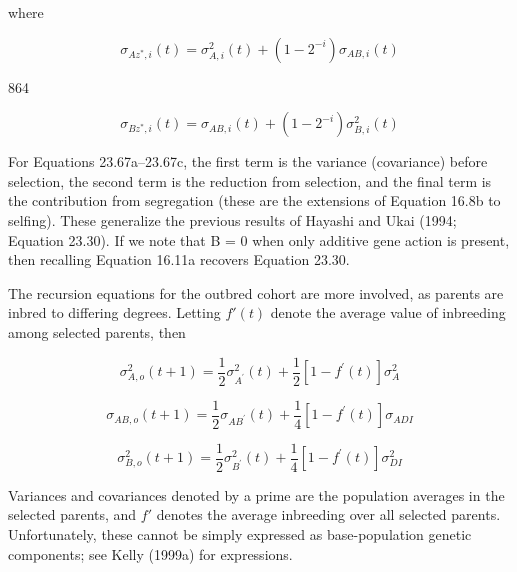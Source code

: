 \documentclass{article}
\begin{document}
where

\begin{equation}
\sigma_{A z^{*},i}(t)=\sigma_{A,i}^{2}(t)+\left(1-2^{-i}\right)\sigma_{A B,i}(t)
\tag{23.67d}
\label{eq:23_67d}
\end{equation}

864

\begin{equation}
\sigma_{B z^{*},i}(t)=\sigma_{A B,i}(t)+(1-2^{-i})\sigma_{B,i}^{2}(t)
\tag{23.67e}
\label{eq:23_67e}
\end{equation}

For Equations 23.67a–23.67c, the first term is the variance (covariance) before selection, the second term is the reduction from selection, and the final term is the contribution from segregation (these are the extensions of Equation 16.8b to selfing). These generalize the previous results of Hayashi and Ukai (1994; Equation 23.30). If we note that B = 0 when only additive gene action is present, then recalling Equation 16.11a recovers Equation 23.30.

The recursion equations for the outbred cohort are more involved, as parents are inbred to differing degrees. Letting  $ f'(t) $ denote the average value of inbreeding among selected parents, then

\begin{equation}
\sigma_{A,o}^{2}(t+1)=\frac{1}{2}\sigma_{A^{\prime}}^{2}(t)+\frac{1}{2}\left[1-f^{\prime}(t)\right]\sigma_{A}^{2}
\tag{23.68a}
\label{eq:23_68a}
\end{equation}

\begin{equation}
\sigma_{AB,o}(t+1)=\frac{1}{2}\sigma_{AB^{\prime}}(t)+\frac{1}{4}[1-f^{\prime}(t)]\sigma_{ADI}
\tag{23.68b}
\label{eq:23_68b}
\end{equation}

\begin{equation}
\sigma_{B,o}^{2}(t+1)=\frac{1}{2}\sigma_{B^{\prime}}^{2}(t)+\frac{1}{4}[1-f^{\prime}(t)]\sigma_{D I}^{2}
\tag{25.08c}
\label{eq:25_08c}
\end{equation}

Variances and covariances denoted by a prime are the population averages in the selected parents, and  $ f' $ denotes the average inbreeding over all selected parents. Unfortunately, these cannot be simply expressed as base-population genetic components; see Kelly (1999a) for expressions.
\end{document}
